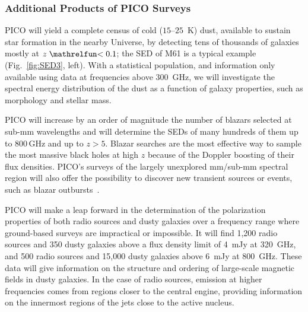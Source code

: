 \documentclass[PICOReport.tex]{subfiles}
\begin{document}
\subsubsection{Additional Products of PICO Surveys}

PICO will yield a complete census of cold ($15$--$25$~K) dust, available to sustain star formation in the nearby Universe, by detecting tens of thousands of galaxies mostly at $z\simlt 0.1$; the \ac{SED} of M61 is a typical example (Fig.~\ref{fig:SED3}, left). With a statistical population, and information only available using data at frequencies above 300~GHz, we will investigate the spectral energy distribution of the dust as a function of galaxy properties, such as morphology and stellar mass. 

PICO will increase by an order of magnitude the number of blazars selected at sub-mm wavelengths and will determine the SEDs of many hundreds of them up to 800\,GHz and up to $z> 5$. Blazar searches are the most effective way to sample the most massive black holes at high $z$ because of the Doppler boosting of their flux densities. PICO's surveys of the largely unexplored mm/sub-mm spectral region will also offer the possibility to discover new transient sources or events, such as blazar outbursts~\cite{Metzger2015}.

PICO will make a leap forward in the determination of the polarization properties of both radio sources and dusty galaxies over a frequency range where ground-based surveys are impractical or impossible.
It will find  1,200 radio sources and 350 dusty galaxies above a flux density limit of 4~mJy at 320~GHz, and 500 radio sources and 15,000 dusty galaxies above 6~mJy at 800~GHz.
These data will give information on the structure and ordering of large-scale magnetic fields in  dusty galaxies. In the case of radio sources, emission at higher frequencies comes from regions closer to the central engine, providing information on the innermost regions of the jets close to the active nucleus. 
\end{document}
